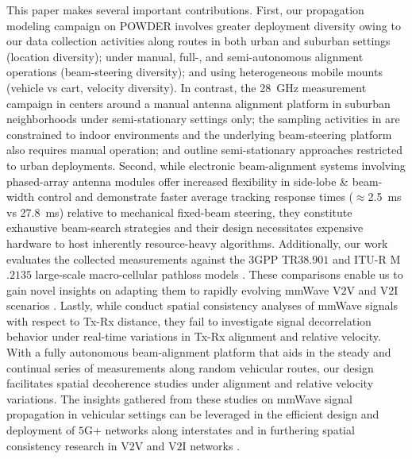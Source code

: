 \documentclass[10pt, twocolumn]{IEEEtran}
\begin{document}
This paper makes several important contributions.  First, our propagation modeling campaign on POWDER involves greater deployment diversity owing to our data collection activities along routes in both urban and suburban settings (location diversity); under manual, full-, and semi-autonomous alignment operations (beam-steering diversity); and using heterogeneous mobile mounts (vehicle vs cart, velocity diversity). In contrast, the \SI{28}{\giga\hertz} measurement campaign in \cite{Purdue} centers around a manual antenna alignment platform in suburban neighborhoods under semi-stationary settings only; the sampling activities in \cite{Harvard} are constrained to indoor environments and the underlying beam-steering platform also requires manual operation; and \cite{MolischSpatialOutdoor, Outdoor28G} outline semi-stationary approaches restricted to urban deployments. Second, while electronic beam-alignment systems \cite{Agile-Link} involving phased-array antenna modules offer increased flexibility in side-lobe \& beam-width control and demonstrate faster average tracking response times (${\approx}$\SI{2.5}{\milli\second} vs \SI{27.8}{\milli\second}) relative to mechanical fixed-beam steering, they constitute exhaustive beam-search strategies and their design necessitates expensive hardware to host inherently resource-heavy algorithms. Additionally, our work evaluates the collected measurements against the $3$GPP TR$38.901$ and ITU-R M$.2135$ large-scale macro-cellular pathloss models \cite{MacCartneyModelsOverview, Qualcomm3GPP}.  These comparisons enable us to gain novel insights on adapting them to rapidly evolving mmWave V$2$V and V$2$I scenarios \cite{5GFastMovingVehicles, V2IMeasurements}. Lastly, while \cite{MolischEstimate, MolischSpatialIndoorOutdoor, MolischSpatialOutdoor, MacCartneySpatialStatistics} conduct spatial consistency analyses of mmWave signals with respect to Tx-Rx distance, they fail to investigate signal decorrelation behavior under real-time variations in Tx-Rx alignment and relative velocity. With a fully autonomous beam-alignment platform that aids in the steady and continual series of measurements along random vehicular routes, our design facilitates spatial decoherence studies under alignment and relative velocity variations. The insights gathered from these studies on mmWave signal propagation in vehicular settings can be leveraged in the efficient design and deployment of $5$G+ networks along interstates \cite{TMobileHighways, 5GADASKorea} and in furthering spatial consistency research in V$2$V and V$2$I networks \cite{MacCartneyModelsOverview}.
\end{document}
